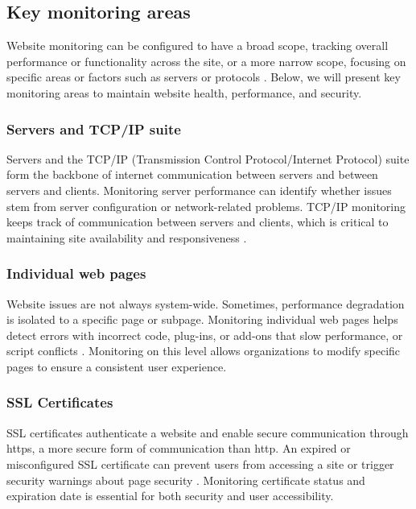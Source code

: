 \subsection{Key monitoring areas}
\label{subsec:key_monitoring_areas}


Website monitoring can be configured to have a broad scope, tracking overall performance or functionality across the site, or a more narrow scope, focusing on specific areas or factors such as servers or protocols \autocite{IBMwebmonitor}. Below, we will present key monitoring areas to maintain website health, performance, and security.

\subsubsection{Servers and TCP/IP suite}
\label{subsubsec:servers_tcp/ip_suite}


Servers and the TCP/IP (Transmission Control Protocol/Internet Protocol) suite form the backbone of internet communication between servers and between servers and clients. Monitoring server performance can identify whether issues stem from server configuration or network-related problems. TCP/IP monitoring keeps track of communication between servers and clients, which is critical to maintaining site availability and responsiveness \autocite{IBMwebmonitor}.

\subsubsection{Individual web pages}
\label{subsubsec:individual_web_pages}


Website issues are not always system-wide. Sometimes, performance degradation is isolated to a specific page or subpage. Monitoring individual web pages helps detect errors with incorrect code, plug-ins, or add-ons that slow performance, or script conflicts \autocite{IBMwebmonitor}. Monitoring on this level allows organizations to modify specific pages to ensure a consistent user experience.

\subsubsection{SSL Certificates}
\label{subsubsec:ssl_certs}


SSL certificates authenticate a website and enable secure communication through \acrshort{https}, a more secure form of communication than \acrshort{http}. An expired or misconfigured SSL certificate can prevent users from accessing a site or trigger security warnings about page security \autocite{IBMwebmonitor}. Monitoring certificate status and expiration date is essential for both security and user accessibility.

